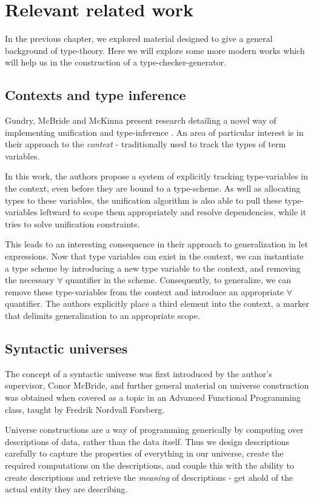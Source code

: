 \chapter{Relevant related work}

In the previous chapter, we explored material designed to give a
general background of type-theory. Here we will explore some more
modern works which will help us in the construction of a
type-checker-generator.

\section{Contexts and type inference}

Gundry, McBride and McKinna present research detailing a
novel way of implementing unification and
type-inference \cite{TypeInferenceInContext}. An area of
particular interest is in their approach to the
\emph{context} - traditionally used to track the types of
term variables.

In this work, the authors propose a system of explicitly
tracking type-variables in the context, even before they are
bound to a type-scheme. As well as allocating types
to these variables, the unification algorithm is also
able to pull these type-variables leftward to scope them
appropriately and resolve dependencies, while it tries to
solve unification constraints.

This leads to an interesting consequence in their approach to
generalization in let expressions. Now that type variables
can exist in the context, we can instantiate a type
scheme by introducing a new type variable to the context,
and removing the necessary $\forall$ quantifier in the
scheme. Consequently, to generalize, we can remove these
type-variables from the context and introduce an
appropriate $\forall$ quantifier. The authors explicitly
place a third element into the context, a marker that delimits
generalization to an appropriate scope.

\section{Syntactic universes}

The concept of a syntactic universe was first introduced by
the author's supervisor, Conor McBride, and further general
material on universe construction was obtained when covered
as a topic in an Advanced Functional Programming class, taught
by Fredrik Nordvall Forsberg.

Universe constructions are a way of programming generically by
computing over descriptions of data, rather than the data itself. Thus
we design descriptions carefully to capture the properties of
everything in our universe, create the required computations on the
descriptions, and couple this with the ability to create descriptions
and retrieve the \emph{meaning} of descriptions - get ahold of
the actual entity they are describing.


